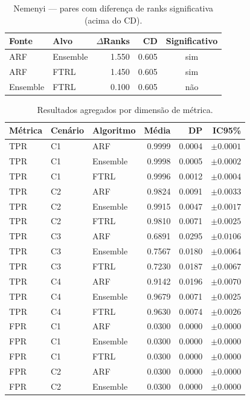 \begin{table}[htbp]
\centering
\caption{Nemenyi — pares com diferença de ranks significativa (acima do CD).}
\label{tab:8-7}
\begin{tabular}{llrrc}
\toprule
Fonte & Alvo & $\Delta$Ranks & CD & Significativo \\
\midrule
ARF & Ensemble & 1.550 & 0.605 & sim \\
ARF & FTRL & 1.450 & 0.605 & sim \\
Ensemble & FTRL & 0.100 & 0.605 & n\~ao \\
\bottomrule
\end{tabular}
\end{table}

\begin{table}[htbp]
\centering
\caption{Resultados agregados por dimensão de métrica.}
\label{tab:8-agreg}
\begin{tabular}{lllrrr}
\toprule
M\'etrica & Cen\'ario & Algoritmo & M\'edia & DP & IC95\% \\
\midrule
TPR & C1 & ARF & 0.9999 & 0.0004 & $\pm 0.0001$ \\
TPR & C1 & Ensemble & 0.9998 & 0.0005 & $\pm 0.0002$ \\
TPR & C1 & FTRL & 0.9996 & 0.0012 & $\pm 0.0004$ \\
TPR & C2 & ARF & 0.9824 & 0.0091 & $\pm 0.0033$ \\
TPR & C2 & Ensemble & 0.9915 & 0.0047 & $\pm 0.0017$ \\
TPR & C2 & FTRL & 0.9810 & 0.0071 & $\pm 0.0025$ \\
TPR & C3 & ARF & 0.6891 & 0.0295 & $\pm 0.0106$ \\
TPR & C3 & Ensemble & 0.7567 & 0.0180 & $\pm 0.0064$ \\
TPR & C3 & FTRL & 0.7230 & 0.0187 & $\pm 0.0067$ \\
TPR & C4 & ARF & 0.9142 & 0.0196 & $\pm 0.0070$ \\
TPR & C4 & Ensemble & 0.9679 & 0.0071 & $\pm 0.0025$ \\
TPR & C4 & FTRL & 0.9630 & 0.0074 & $\pm 0.0026$ \\
FPR & C1 & ARF & 0.0300 & 0.0000 & $\pm 0.0000$ \\
FPR & C1 & Ensemble & 0.0300 & 0.0000 & $\pm 0.0000$ \\
FPR & C1 & FTRL & 0.0300 & 0.0000 & $\pm 0.0000$ \\
FPR & C2 & ARF & 0.0300 & 0.0000 & $\pm 0.0000$ \\
FPR & C2 & Ensemble & 0.0300 & 0.0000 & $\pm 0.0000$ \\

\end{tabular}
\end{table}
